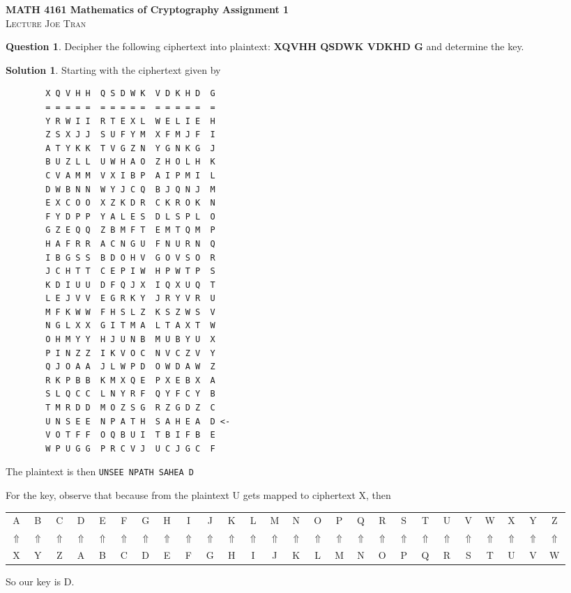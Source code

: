 \documentclass[11pt]{amsart}
\date{January 9, 2024}
\theoremstyle{definition}\newtheorem{definition}{Definition}
\theoremstyle{definition}\newtheorem{question}{Question}
\theoremstyle{definition}\newtheorem*{solution}{Solution}
\begin{document}
\noindent \textbf{MATH 4161 Mathematics of Cryptography} \hfill \textbf{Assignment 1} \\
\noindent \textsc{Lecture} \hfill \textsc{Joe Tran}

\begin{question}
    Decipher the following ciphertext into plaintext: \textbf{\textsf{XQVHH QSDWK VDKHD G}} and determine the key.
\end{question}

\begin{solution}
    Starting with the ciphertext given by
    \begin{verbatim}
        X Q V H H  Q S D W K  V D K H D  G
        = = = = =  = = = = =  = = = = =  =
        Y R W I I  R T E X L  W E L I E  H
        Z S X J J  S U F Y M  X F M J F  I
        A T Y K K  T V G Z N  Y G N K G  J
        B U Z L L  U W H A O  Z H O L H  K
        C V A M M  V X I B P  A I P M I  L
        D W B N N  W Y J C Q  B J Q N J  M
        E X C O O  X Z K D R  C K R O K  N
        F Y D P P  Y A L E S  D L S P L  O
        G Z E Q Q  Z B M F T  E M T Q M  P
        H A F R R  A C N G U  F N U R N  Q
        I B G S S  B D O H V  G O V S O  R
        J C H T T  C E P I W  H P W T P  S
        K D I U U  D F Q J X  I Q X U Q  T
        L E J V V  E G R K Y  J R Y V R  U
        M F K W W  F H S L Z  K S Z W S  V
        N G L X X  G I T M A  L T A X T  W
        O H M Y Y  H J U N B  M U B Y U  X
        P I N Z Z  I K V O C  N V C Z V  Y
        Q J O A A  J L W P D  O W D A W  Z
        R K P B B  K M X Q E  P X E B X  A
        S L Q C C  L N Y R F  Q Y F C Y  B
        T M R D D  M O Z S G  R Z G D Z  C
        U N S E E  N P A T H  S A H E A  D <-
        V O T F F  O Q B U I  T B I F B  E
        W P U G G  P R C V J  U C J G C  F
    \end{verbatim}
    The plaintext is then \verb|UNSEE NPATH SAHEA D|
\end{solution}

For the key, observe that because from the plaintext U gets mapped to ciphertext X, then
\begin{center}
    \begin{tabular}{cccccccccccccccccccccccccc}
        A & B & C & D & E & F & G & H & I & J & K & L & M & N & O & P & Q & R & S & T & U & V & W & X & Y & Z \\
        $\Uparrow$ & $\Uparrow$ & $\Uparrow$ & $\Uparrow$ & $\Uparrow$ & $\Uparrow$ & $\Uparrow$ & $\Uparrow$ & $\Uparrow$ & $\Uparrow$ & $\Uparrow$ & $\Uparrow$ & $\Uparrow$ & $\Uparrow$ & $\Uparrow$ & $\Uparrow$ & $\Uparrow$ & $\Uparrow$ & $\Uparrow$ & $\Uparrow$ & $\Uparrow$ & $\Uparrow$ & $\Uparrow$ & $\Uparrow$ & $\Uparrow$ & $\Uparrow$ \\
        X & Y & Z & A & B & C & D & E & F & G & H & I & J & K & L & M & N & O & P & Q & R & S & T & U & V & W
    \end{tabular}
\end{center}
So our key is D.
\end{document}
